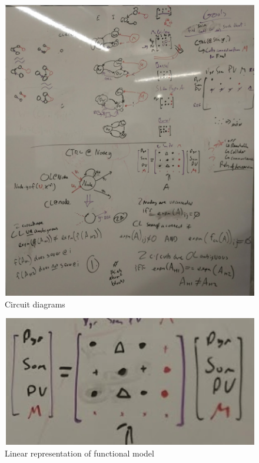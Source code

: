 \begin{figure}[h]
    \centering
    \includegraphics[width=\textwidth]{big_circuit_wb.png}
    \caption{Circuit diagrams}
\end{figure}

\begin{figure}[h]
    \centering
    \includegraphics[width=\textwidth]{just_adj_mat.png}
    \caption{Linear representation of functional model}
\end{figure}

